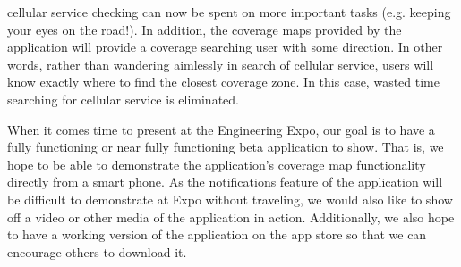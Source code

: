 \documentclass[letterpaper,10pt,draftclsnofoot,onecolumn]{IEEEtran}
\begin{document}
cellular service checking can now be spent on more important tasks (e.g. keeping
your eyes on the road!). In addition, the coverage maps provided by the
application will provide a coverage searching user with some direction. In other
words, rather than wandering aimlessly in search of cellular service, users will
know exactly where to find the closest coverage zone. In this case, wasted time
searching for cellular service is eliminated.\par
When it comes time to present at the Engineering Expo, our goal is to have a
fully functioning or near fully functioning beta application to show. That is,
we hope to be able to demonstrate the application's coverage map functionality
directly from a smart phone. As the notifications feature of the application will
be difficult to demonstrate at Expo without traveling, we would also like
to show off a video or other media of the application in action. Additionally,
we also hope to have a working version of the application on the app store so
that we can encourage others to download it.\par
\end{document}
